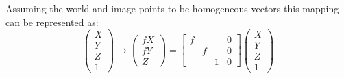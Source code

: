     Assuming the world and image points to be homogeneous vectors this mapping can be represented as:
  \begin{equation}
\left(\begin{array}{c}X \\ Y \\ Z \\ 1 \end{array}\right) \rightarrow \left(\begin{array}{c} fX \\ fY \\ Z \end{array}\right) = \begin{bmatrix}f & & & 0 \\  &f & & 0  \\   & &1 & 0   \end{bmatrix}\left(\begin{array}{c}X\\ Y  \\Z \\ 1 \end{array}\right)
\end{equation}

